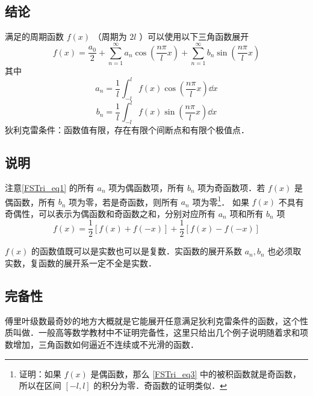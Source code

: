



\subsection{结论}
满足的周期函数 $f(x)$ （周期为 $2l$ ）可以使用以下三角函数展开
\begin{equation}\label{FSTri_eq1}
f( x ) = \frac{a_0}{2} + \sum_{n = 1}^\infty a_n \cos (\frac{n\pi}{l}x) + \sum_{n = 1}^\infty b_n \sin (\frac{n\pi}{l}x)
\end{equation}
其中
\begin{equation}\label{FSTri_eq2}
a_n = \frac{1}{l} \int_{ - l}^l f( x )\cos(\frac{n\pi}{l}x) \dd{x} 
\end{equation}
\begin{equation}\label{FSTri_eq3}
b_n = \frac{1}{l} \int_{ - l}^l f( x )\sin(\frac{n\pi}{l}x) \dd{x}
\end{equation}
狄利克雷条件：函数值有限，存在有限个间断点和有限个极值点．

\subsection{说明}
注意\autoref{FSTri_eq1} 的所有 $a_n$ 项为偶函数项，所有 $b_n$ 项为奇函数项．若 $f(x)$ 是偶函数，所有 $b_n$ 项为零，若是奇函数，则所有 $a_n$ 项为零\footnote{证明：如果 $f(x)$ 是偶函数，那么 \autoref{FSTri_eq3} 中的被积函数就是奇函数，所以在区间 $[-l,l]$ 的积分为零．奇函数的证明类似．}． 如果 $f(x)$ 不具有奇偶性，可以表示为偶函数和奇函数之和，分别对应所有 $a_n$ 项和所有 $b_n$ 项
\begin{equation}
f(x) = \frac12 [f(x)+f(-x)] + \frac12 [f(x)-f(-x)]
\end{equation}

$f(x)$ 的函数值既可以是实数也可以是复数．实函数的展开系数 $a_n, b_n$ 也必须取实数，复函数的展开系一定不全是实数．

\subsection{完备性}
傅里叶级数最奇妙的地方大概就是它能展开任意满足狄利克雷条件的函数，这个性质叫做．一般高等数学教材中不证明完备性，这里只给出几个例子说明随着求和项数增加，三角函数如何逼近不连续或不光滑的函数．

